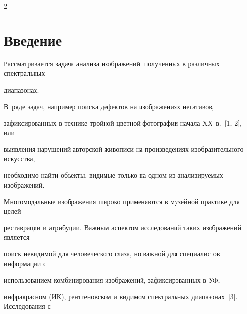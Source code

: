 









      \thispagestyle{headings}





      \begin{multicols}{2}


      


            \label{st\stat}





\section{Введение}





  Рассматривается задача анализа изображений, полученных в различных спектральных 


диапазонах. 





В~ряде задач, например поиска дефектов на изображениях негативов, 


зафиксированных в технике тройной цветной фотографии начала XX~в.~[1, 2], или 


выявления нарушений авторской живописи на произведениях изобразительного искусства, 


необходимо найти объекты, видимые только на одном из анализируемых изображений. 





Многомодальные изображения широко применяются в музейной практике для целей 


реставрации и атрибуции. Важным аспектом исследований таких изображений является 


поиск невидимой для человеческого глаза, но важной для специалистов информации с 


использованием комбинирования изображений, зафиксированных в УФ, 


инфракрасном (ИК), рентгеновском и видимом спектральных диапазонах~[3]. Исследования с 



\end{multicols}

